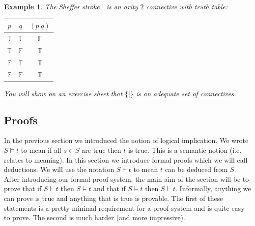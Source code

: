 \documentclass[11pt]{article}
\newcommand{\proves}{\vdash}
\newtheorem{example}[theorem]{Example}
\newcommand{\F}{\mathbb{F}}
\newcommand{\T}{\mathbb{T}}
\begin{document}
\begin{example}
The Sheffer stroke $|$ is an arity $2$ connective with truth table:
\medskip

\noindent
\begin{tabular}{|c|c||c|}
  \hline
  $p$ & $q$ & $(p | q)$ \\ \hline
  $\T$ & $\T$ & $\F$ \\
  $\T$ & $\F$ & $\T$ \\
  $\F$ & $\T$ & $\T$ \\
  $\F$ & $\F$ & $\T$ \\
  \hline
\end{tabular}
\medskip

\noindent
You will show on an exercise sheet that $\{|\}$ is an adequate set of connectives.
\end{example}


%
%



\subsection{Proofs}

In the previous section we introduced the notion of logical implication. We wrote $S\models t$ to mean if all $s\in S$ are true then $t$ is true. This is a semantic notion (i.e. relates to meaning). In this section we introduce formal proofs which we will call deductions. We will use the notation $S\proves t$ to mean $t$ can be deduced from $S$. After introducing our formal proof system, the main aim of the section will be to prove that if $S\proves t$ then $S\models t$ and that if $S\models t$ then $S\proves t$. Informally, anything we can prove is true and anything that is true is provable. The first of these statements is a pretty minimal requirement for a proof system and is quite easy to prove. The second is much harder (and more impressive).
\end{document}
